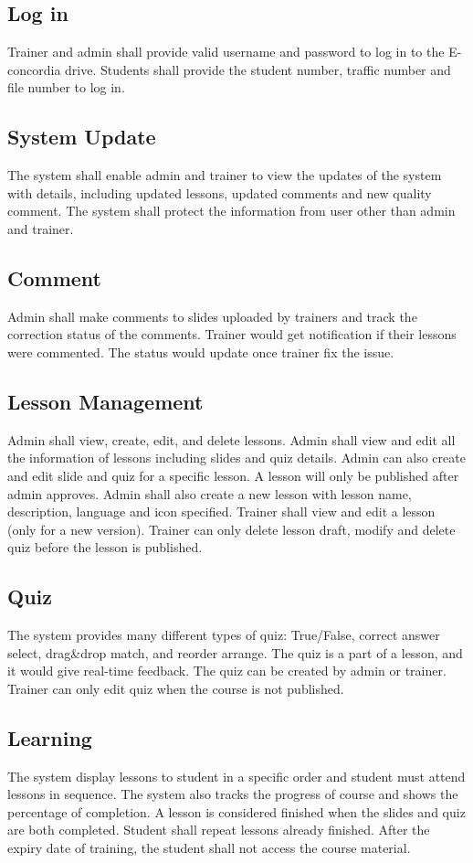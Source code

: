 \documentclass[a4paper]{article}
\begin{document}
\subsection{Log in}
Trainer and admin shall provide valid username and password to log in to the E-concordia drive. 
Students shall provide the student number, traffic number and file number to log in.
\bigskip
\subsection{System Update}
The system shall enable admin and trainer to view the updates of the system with details, including updated lessons, updated comments and new quality comment. The system shall protect the information from user other than admin and trainer.
\bigskip
\subsection{Comment}
Admin shall make comments to slides uploaded by trainers and track the correction status of the comments.  Trainer would get notification if their lessons were commented. The status would update once trainer fix the issue.
\bigskip
\subsection{Lesson Management}
Admin shall view, create, edit, and delete lessons. Admin shall view and edit all the information of lessons including slides and quiz details. Admin can also create and edit slide and quiz for a specific lesson. A lesson will only be published after admin approves. Admin shall also create a new lesson with lesson name, description, language and icon specified.
Trainer shall view and edit a lesson (only for a new version). Trainer can only delete lesson draft, modify and delete quiz before the lesson is published.
\bigskip
\subsection{Quiz}
The system provides many different types of quiz: True/False, correct answer select, drag\&drop match, and reorder arrange. The quiz is a part of a lesson, and it would give real-time feedback. The quiz can be created by admin or trainer. Trainer can only edit quiz when the course is not published.
\bigskip
\subsection{Learning}
The system display lessons to student in a specific order and student must attend lessons in sequence. The system also tracks the progress of course and shows the percentage of completion. A lesson is considered finished when the slides and quiz are both completed. Student shall repeat lessons already finished. After the expiry date of training, the student shall not access the course material. 
\bigskip
\end{document}
